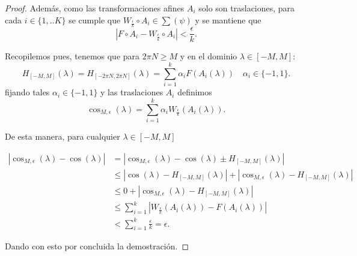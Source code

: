 \begin{proof}
    Además, como las transformaciones afines $A_i$ solo son traslaciones,
    para cada $i \in \{1,..K\}$ se cumple que 
     $W_{ \frac{\epsilon}{k}} \circ A_i \in \sum(\psi)$ y se mantiene que 
    \begin{equation}
        |F \circ A_i - W_{ \frac{\epsilon}{k}} \circ A_i | < \frac{\epsilon}{k}. 
    \end{equation}


    Recopilemos pues, tenemos que para $2\pi N \geq M$ y en el dominio $\lambda \in [-M, M]$: 
    \begin{equation}
        H_{[-M, M]} (\lambda) = 
        H_{[-2\pi N, 2 \pi N]}(\lambda) = 
        \sum_{i=1}^k \alpha_i F( A_i(\lambda)) \quad \alpha_i \in \{-1,1\}.
    \end{equation}
    fijando tales $\alpha_i \in \{-1,1\}$ y las traslaciones $A_i$ definimos 
    \begin{equation}
        \cos_{M, \epsilon}(\lambda) = \sum_{i=1}^k 
        \alpha_i  W_{ \frac{\epsilon}{k}}(A_i(\lambda)). 
    \end{equation}

    De esta manera, para cualquier $\lambda \in [-M, M]$

    \begin{equation}
        \begin{split}
            |\cos_{M,\epsilon}(\lambda) - \cos(\lambda)| 
            &= |\cos_{M,\epsilon}(\lambda) - \cos(\lambda) \pm  H_{[- M, M]}(\lambda)| \\
            &\leq
            |\cos(\lambda) -  H_{[- M, M]}(\lambda)|
            + 
            | \cos_{M,\epsilon}(\lambda) -  H_{[- M, M]}(\lambda)|  \\
            &\leq  0 
            + | \cos_{M,\epsilon}(\lambda) -  H_{[- M, M]}(\lambda)| \\
            & \leq  \sum_{i=1}^k 
            |  W_{ \frac{\epsilon}{k}}(A_i(\lambda)) 
            -
            F( A_i(\lambda))
             | \\
             & <   \sum_{i=1}^k \frac{\epsilon}{k} = \epsilon .
        \end{split}
    \end{equation}

    Dando con esto por concluida la demostración. 
 
\end{proof}

